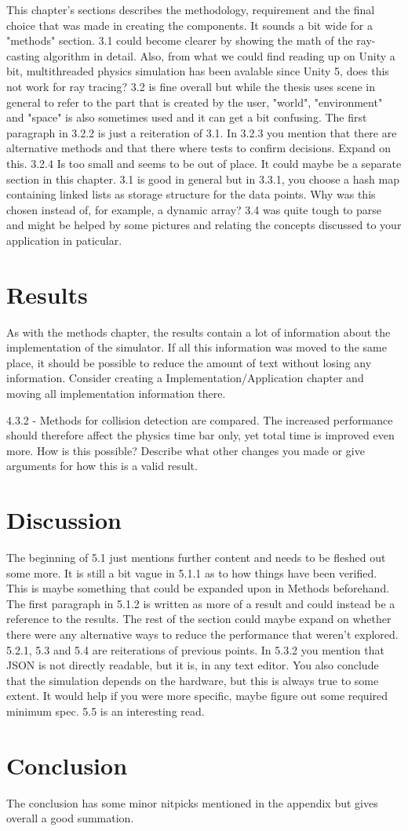 \documentclass[12pt,a4paper,twoside,openright]{report}
\begin{document}
	This chapter's sections describes the methodology, requirement and the
	final choice that was made in creating the components. It sounds a bit wide
	for a "methods" section. 3.1 could become clearer by showing the math of
	the ray-casting algorithm in detail. Also, from what we could find reading
	up on Unity a bit, multithreaded physics simulation has been avalable since
	Unity 5, does this not work for ray tracing? 3.2 is fine overall but while
	the thesis uses scene in general to refer to the part that is created by
	the user, "world", "environment" and "space" is also sometimes used and it
	can get a bit confusing. The first paragraph in 3.2.2 is just a reiteration
	of 3.1. In 3.2.3 you mention that there are alternative methods and that
	there where tests to confirm decisions. Expand on this. 3.2.4 Is too small
	and seems to be out of place.  It could maybe be a separate section in this
	chapter. 3.1 is good in general but in 3.3.1, you choose a hash map 
	containing linked lists as storage structure for the data points. Why was 
	this chosen instead of, for example, a dynamic array? 3.4 was quite tough
	to parse and might be helped by some pictures and relating the concepts
	discussed to your application in paticular.

\section*{Results}

	As with the methods chapter, the results contain a lot of information about
	the implementation of the simulator. If all this information was moved to
	the same place, it should be possible to reduce the amount of text without
	losing any information. Consider creating a Implementation/Application 
	chapter and moving all implementation information there.
	
	4.3.2 - Methods for collision detection are compared. The increased 
	performance should therefore affect the physics time bar only, yet total 
	time is improved even more. How is this possible? Describe what other 
	changes you made or give arguments for how this is a valid result.

\section*{Discussion}

	The beginning of 5.1 just mentions further content and needs to be fleshed 
	out	some more. It is still a bit vague in 5.1.1 as to how things have been
	verified. This is maybe something that could be expanded upon in Methods
	beforehand. The first paragraph in 5.1.2 is written as more of a result and
	could instead be a reference to the results. The rest of the section could
	maybe expand on whether there were any alternative ways to reduce the
	performance that weren't explored. 5.2.1, 5.3 and 5.4 are reiterations of
	previous points. In 5.3.2 you mention that JSON is not directly readable, 
	but it is, in any text editor. You also conclude that the simulation 
	depends on the hardware, but this is always true to some extent. It would 
	help if you were more specific, maybe figure out some required minimum 
	spec. 5.5 is an interesting read.

\section*{Conclusion}

	The conclusion has some minor nitpicks mentioned in the appendix but gives
	overall a good summation.
\end{document}
